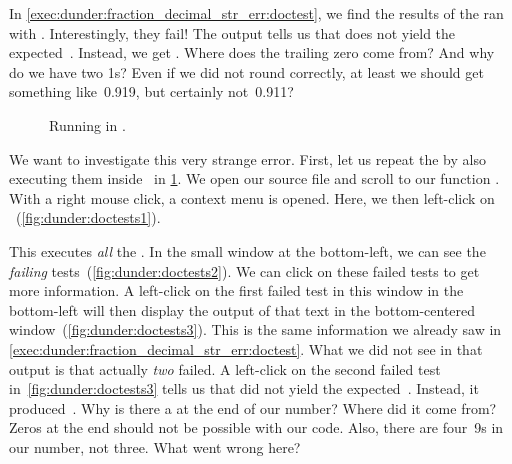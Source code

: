 In \cref{exec:dunder:fraction_decimal_str_err:doctest}, we find the results of the  ran with \pytest.
Interestingly, they fail!
The output tells us that  does not yield the expected~.
Instead, we get .
Where does the trailing zero come from?
And why do we have two 1s?
Even if we did not round correctly, at least we should get something like~0.919, but certainly not~0.911?

\begin{figure}%
\centering%
%
%
%
\floatSep%
%
%
%
\floatRowSep%
%
%
%
\floatSep%
%
%
\caption{Running  in \pycharm.}%
\label{fig:dunder:doctests}%
\end{figure}%

We want to investigate this very strange error.
First, let us repeat the  by also executing them inside \pycharm\ in \cref{fig:dunder:doctests}.
We open our source file and scroll to our function .
With a right mouse click, a context menu is opened.
Here, we then left-click on ~(\cref{fig:dunder:doctests1}).

This executes \emph{all} the .
In the small window at the bottom-left, we can see the \emph{failing} tests~(\cref{fig:dunder:doctests2}).
We can click on these failed tests to get more information.
A left-click on the first failed test in this window in the bottom-left will then display the output of that text in the bottom-centered window~(\cref{fig:dunder:doctests3}).
This is the same information we already saw in \cref{exec:dunder:fraction_decimal_str_err:doctest}.
What we did not see in that output is that actually \emph{two}  failed.
A left-click on the second failed test in~\cref{fig:dunder:doctests3} tells us that  did not yield the expected~.
Instead, it produced~.
Why is there a  at the end of our number?
Where did it come from?
Zeros at the end should not be possible with our code.
Also, there are four~9s in our number, not three.
What went wrong here?


